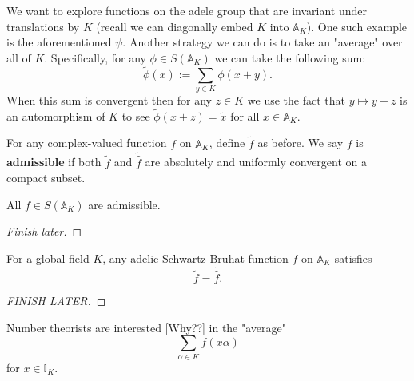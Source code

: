 \documentclass[11pt, x11names]{article}
\renewcommand{\aa}{\mathbb{A}}
\newcommand{\ii}{\mathbb{I}}
\renewcommand{\hat}{\widehat}
\begin{document}
We want to explore functions on the adele group that are invariant under translations by $K$ (recall we can diagonally embed $K$ into $\aa_K$). One such example is the aforementioned $\psi$. Another strategy we can do is to take an "average" over all of $K$. Specifically, for any $\phi \in S(\aa_K)$ we can take the following sum:
\begin{equation*}
    \widetilde{\phi}(x) := \sum_{y \in K} \phi(x + y).
\end{equation*}
When this sum is convergent then for any $z \in K$ we use the fact that $y \mapsto y + z$ is an automorphism of $K$ to see $\widetilde{\phi}(x + z) = \widetilde{x}$ for all $x \in \aa_K$.
\begin{defn}
\label{def: admissible function}
    For any complex-valued function $f$ on $\aa_K$, define $\widetilde{f}$ as before. We say $f$ is \textbf{admissible} if both $\widetilde{f}$ and $\widetilde{\hat{f}}$ are absolutely and uniformly convergent on a compact subset. 
\end{defn}

\begin{lemma}
\label{lemma: all adelic-SB-functions are admissible}
All $f \in S(\aa_K)$ are admissible.
\end{lemma}
\begin{proof}
    [Finish later]
\end{proof}

\begin{theorem}
\label{thm: Poisson Summation formula}
For a global field $K$, any adelic Schwartz-Bruhat function $f$ on $\aa_K$ satisfies
\begin{equation*}
    \widetilde{f} = \widetilde{\hat{f}}.
\end{equation*}
\end{theorem}
\begin{proof}
[FINISH LATER]
\end{proof}

Number theorists are interested [Why??] in the "average"
\begin{equation*}
    \sum_{\alpha \in K} f(x\alpha )
\end{equation*}
for $x \in \ii_K$. 
\end{document}
